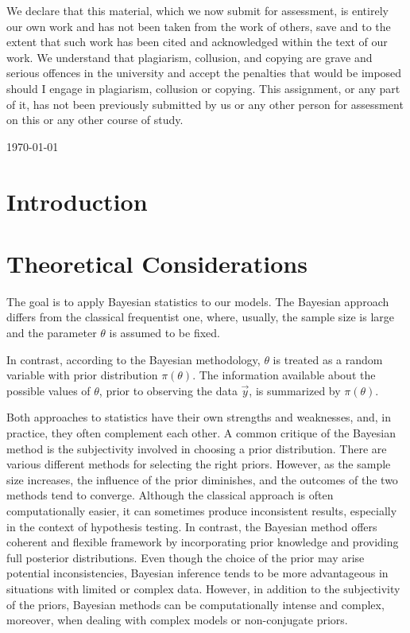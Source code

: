 \documentclass{Class/julia}
\begin{document}
\begin{titlepage}
\begin{center}
\begin{figure}[h!]
\end{figure}
\end{center}
\vfill
\begin{center}
{\small{We declare that this material, which we now submit for assessment, is entirely our own work and has not been taken from the work of others, save and to the extent that such work has been cited and acknowledged within the text of our work. We understand that plagiarism, collusion, and copying are grave and serious offences in the university and accept the penalties that would be imposed should I engage in plagiarism, collusion or copying. This assignment, or any part of it, has not been previously submitted by us or any other person for assessment on this or any other course of study.}}
\end{center}
\vfill
    {\large \today \par}
    \vfill
\end{titlepage}

\tableofcontents

\section{Introduction}

\section{Theoretical Considerations}
The goal is to apply Bayesian statistics to our models. The Bayesian approach differs from the classical frequentist one, where, usually, the sample size is large and the parameter \( \theta \) is assumed to be fixed.

In contrast, according to the Bayesian methodology, \( \theta \) is treated as a random variable with prior distribution \( \pi(\theta) \). The information available about the possible values of \( \theta \), prior to observing the data \( \vec y \), is summarized by \( \pi(\theta) \).

Both approaches to statistics have their own strengths and weaknesses, and, in practice, they often complement each other. A common critique of the Bayesian method is the subjectivity involved in choosing a prior distribution. There are various different methods for selecting the right priors. However, as the sample size increases, the influence of the prior diminishes, and the outcomes of the two methods tend to converge. 
Although the classical approach is often computationally easier, it can sometimes produce inconsistent results, especially in the context of hypothesis testing. In contrast, the Bayesian method offers coherent and flexible framework by incorporating prior knowledge and providing full posterior distributions. Even though the choice of the prior may arise potential inconsistencies, Bayesian inference tends to be more advantageous in situations with limited or complex data.
However, in addition to the subjectivity of the priors, Bayesian methods can be computationally intense and complex, moreover, when dealing with complex models or non-conjugate priors. 
\end{document}
